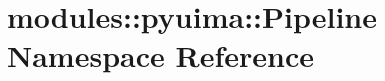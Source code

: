 \hypertarget{namespacemodules_1_1pyuima_1_1Pipeline}{\section{modules\-:\-:pyuima\-:\-:\-Pipeline \-Namespace \-Reference}
\label{namespacemodules_1_1pyuima_1_1Pipeline}
}
